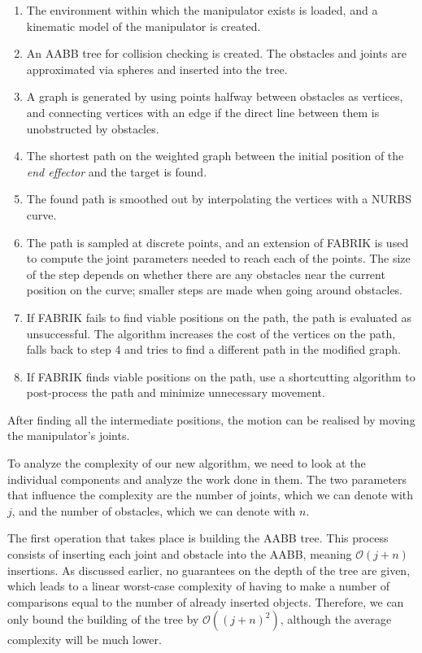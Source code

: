 \begin{enumerate}
\item The environment within which the manipulator exists is loaded, and a kinematic model of the manipulator is created.
\item An AABB tree for collision checking is created. The obstacles and joints are approximated via spheres and inserted into the tree.
\item A graph is generated by using points halfway between obstacles as vertices, and connecting vertices with an edge if the direct line between them is unobstructed by obstacles.
\item The shortest path on the weighted graph between the initial position of the \textit{end effector} and the target is found.
\item The found path is smoothed out by interpolating the vertices with a NURBS curve.
\item The path is sampled at discrete points, and an extension of FABRIK is used to compute the joint parameters needed to reach each of the points. The size of the step depends on whether there are any obstacles near the current position on the curve; smaller steps are made when going around obstacles.
\item If FABRIK fails to find viable positions on the path, the path is evaluated as unsuccessful. The algorithm increases the cost of the vertices on the path, falls back to step 4 and tries to find a different path in the modified graph.
\item If FABRIK finds viable positions on the path, use a shortcutting algorithm to post-process the path and minimize unnecessary movement.
\end{enumerate}

After finding all the intermediate positions, the motion can be realised by moving the manipulator's joints.

To analyze the complexity of our new algorithm, we need to look at the individual components and analyze the work done in them. The two parameters that influence the complexity are the number of joints, which we can denote with $j$, and the number of obstacles, which we can denote with $n$.

The first operation that takes place is building the AABB tree. This process consists of inserting each joint and obstacle into the AABB, meaning $\mathcal{O}(j + n)$ insertions. As discussed earlier, no guarantees on the depth of the tree are given, which leads to a linear worst-case complexity of having to make a number of comparisons equal to the number of already inserted objects. Therefore, we can only bound the building of the tree by $\mathcal{O}({(j+n)}^2)$, although the average complexity will be much lower.

